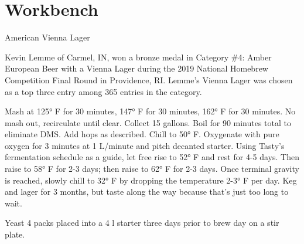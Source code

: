 \documentclass[10pt,oneside]{scrbook}
\begin{document}
\mainmatter
\twocolumn

\part{Workbench}

\begin{recipie}{American Vienna Lager}

\begin{aboutblock}
Kevin Lemme of Carmel, IN, won a bronze medal in Category \#4: Amber European Beer with
a Vienna Lager during the 2019 National Homebrew Competition Final Round in Providence,
RI. Lemme's Vienna Lager was chosen as a top three entry among 365 entries in the category.
\end{aboutblock}


\begin{methodandtiming}
 
\begin{mashsteps}
\end{mashsteps}

\begin{fermentationsteps}
\end{fermentationsteps}

\begin{directions}
Mash at 125° F for 30 minutes, 147° F for 30 minutes, 162° F for 30 minutes. No mash out, recirculate until clear.  Collect 15 gallons.  Boil for 90 minutes total to eliminate DMS.  Add hops as described. Chill to 50° F. Oxygenate with pure oxygen for 3 minutes at 1 L/minute and pitch decanted starter. Using Tasty’s fermentation schedule as a guide, let free rise to 52° F and rest for 4-5 days.  Then raise to 58° F for 2-3 days; then raise to 62° F for 2-3 days.  Once terminal gravity is reached, slowly chill to 32° F by dropping the temperature 2-3° F per day.  Keg and lager for 3 months, but taste along the way because that’s just too long to wait.

Yeast 4 packs placed into a 4 l starter three days prior to brew day on a stir plate.
\end{directions}

\end{methodandtiming}

\pagebreak

\begin{ingredientsblock}


\end{ingredientsblock}
\end{recipie}
\end{document}

